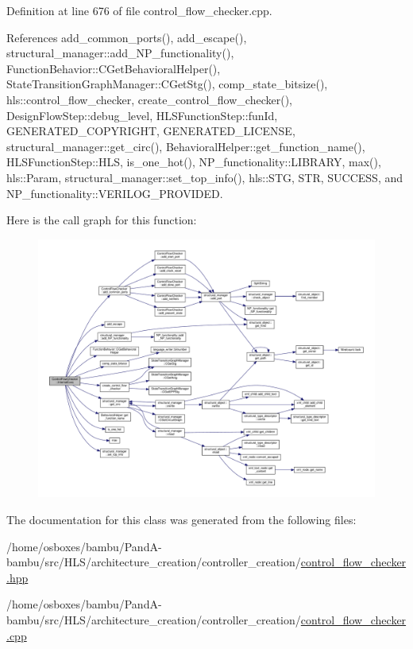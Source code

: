 Definition at line 676 of file control\+\_\+flow\+\_\+checker.\+cpp.



References add\+\_\+common\+\_\+ports(), add\+\_\+escape(), structural\+\_\+manager\+::add\+\_\+\+N\+P\+\_\+functionality(), Function\+Behavior\+::\+C\+Get\+Behavioral\+Helper(), State\+Transition\+Graph\+Manager\+::\+C\+Get\+Stg(), comp\+\_\+state\+\_\+bitsize(), hls\+::control\+\_\+flow\+\_\+checker, create\+\_\+control\+\_\+flow\+\_\+checker(), Design\+Flow\+Step\+::debug\+\_\+level, H\+L\+S\+Function\+Step\+::fun\+Id, G\+E\+N\+E\+R\+A\+T\+E\+D\+\_\+\+C\+O\+P\+Y\+R\+I\+G\+HT, G\+E\+N\+E\+R\+A\+T\+E\+D\+\_\+\+L\+I\+C\+E\+N\+SE, structural\+\_\+manager\+::get\+\_\+circ(), Behavioral\+Helper\+::get\+\_\+function\+\_\+name(), H\+L\+S\+Function\+Step\+::\+H\+LS, is\+\_\+one\+\_\+hot(), N\+P\+\_\+functionality\+::\+L\+I\+B\+R\+A\+RY, max(), hls\+::\+Param, structural\+\_\+manager\+::set\+\_\+top\+\_\+info(), hls\+::\+S\+TG, S\+TR, S\+U\+C\+C\+E\+SS, and N\+P\+\_\+functionality\+::\+V\+E\+R\+I\+L\+O\+G\+\_\+\+P\+R\+O\+V\+I\+D\+ED.

Here is the call graph for this function\+:
\nopagebreak
\begin{figure}[H]
\begin{center}
\leavevmode
\includegraphics[width=350pt]{d0/dea/classControlFlowChecker_ac563bc1d94b92827854435787625d8a5_cgraph}
\end{center}
\end{figure}


The documentation for this class was generated from the following files\+:\begin{DoxyCompactItemize}
\item 
/home/osboxes/bambu/\+Pand\+A-\/bambu/src/\+H\+L\+S/architecture\+\_\+creation/controller\+\_\+creation/\hyperlink{control__flow__checker_8hpp}{control\+\_\+flow\+\_\+checker.\+hpp}\item 
/home/osboxes/bambu/\+Pand\+A-\/bambu/src/\+H\+L\+S/architecture\+\_\+creation/controller\+\_\+creation/\hyperlink{control__flow__checker_8cpp}{control\+\_\+flow\+\_\+checker.\+cpp}\end{DoxyCompactItemize}
